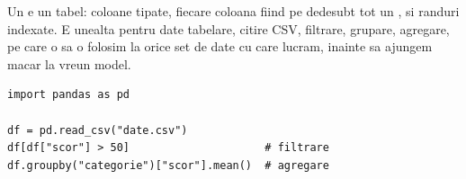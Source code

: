 Un  e un tabel: coloane tipate, fiecare coloana fiind pe
dedesubt tot un , si randuri indexate. E unealta pentru
date tabelare, citire CSV, filtrare, grupare, agregare, pe care o sa o
folosim la orice set de date cu care lucram, inainte sa ajungem macar la
vreun model.

\begin{verbatim}
import pandas as pd

df = pd.read_csv("date.csv")
df[df["scor"] > 50]                     # filtrare
df.groupby("categorie")["scor"].mean()  # agregare
\end{verbatim}

